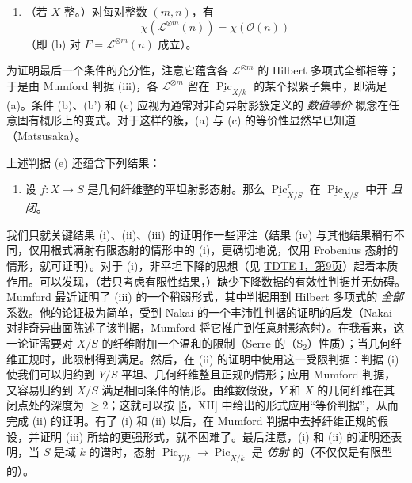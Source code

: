 \begin{remark}{}
\begin{enumerate}
\begin{enumerate}
            
 \item[e.]（若 \(X\) 整。）对每对整数 \((m,n)\)，有 \[                 \chi (\mathscr {L}^{\otimes  m}(n))                 = \chi (\mathcal {O}(n))               \]（即 (b) 对 \(F=\mathscr {L}^{\otimes  m}(n)\) 成立）。

          \end{enumerate}
      

    \end{enumerate}\par{}为证明最后一个条件的充分性，注意它蕴含各 \(\mathscr {L}^{\otimes  m}\) 的 Hilbert 多项式全都相等；于是由 Mumford 判据 (iii)，各 \(\mathscr {L}^{\otimes  m}\) 留在 \(\underline {\operatorname {Pic}}_{X/k}\) 的某个拟紧子集中，即满足 (a)。条件 (b)、(b') 和 (c) 应视为通常对非奇异射影簇定义的 \emph{数值等价} 概念在任意固有概形上的变式。对于这样的簇，(a) 与 (c) 的等价性显然早已知道（Matsusaka）。\par{}上述判据 (e) 还蕴含下列结果：\begin{enumerate}
      
 \item[ix.]设 \(f\colon  X\to  S\) 是几何纤维整的平坦射影态射。那么 \(\underline {\operatorname {Pic}}_{X/S}^\tau \) 在 \(\underline {\operatorname {Pic}}_{X/S}\) 中开 \emph{且闭}。

    \end{enumerate}\par{}我们只就关键结果 (i)、(ii)、(iii) 的证明作一些评注（结果 (iv) 与其他结果稍有不同，仅用根式满射有限态射的情形中的 (i)，更确切地说，仅用 Frobenius 态射的情形，就可证明）。对于 (i)，非平坦下降的思想（见 \hyperref[fga3.i-a.2.c]{TDTE I，第9页}）起着本质作用。可以发现，（若只考虑有限性结果，）缺少下降数据的有效性判据并无妨碍。Mumford 最近证明了 (iii) 的一个稍弱形式，其中判据用到 Hilbert 多项式的 \emph{全部} 系数。他的论证极为简单，受到 Nakai 的一个丰沛性判据的证明的启发（Nakai 对非奇异曲面陈述了该判据，Mumford 将它推广到任意射影态射）。在我看来，这一论证需要对 \(X/S\) 的纤维附加一个温和的限制（Serre 的（\(\text {S}_2\)）性质）；当几何纤维正规时，此限制得到满足。然后，在 (ii) 的证明中使用这一受限判据：判据 (i) 使我们可以归约到 \(Y/S\) 平坦、几何纤维整且正规的情形；应用 Mumford 判据，又容易归约到 \(X/S\) 满足相同条件的情形。由维数假设，\(Y\) 和 \(X\) 的几何纤维在其闭点处的深度为 \(\geqslant 2\)；这就可以按 [\hyperref[fga3.vi-bib-5]{5}，XII] 中给出的形式应用“等价判据”，从而完成 (ii) 的证明。有了 (i) 和 (ii) 以后，在 Mumford 判据中去掉纤维正规的假设，并证明 (iii) 所给的更强形式，就不困难了。最后注意，(i) 和 (ii) 的证明还表明，当 \(S\) 是域 \(k\) 的谱时，态射 \(\underline {\operatorname {Pic}}_{Y/k}\to \underline {\operatorname {Pic}}_{X/k}\) 是 \emph{仿射} 的（不仅仅是有限型的）。\end{remark}
